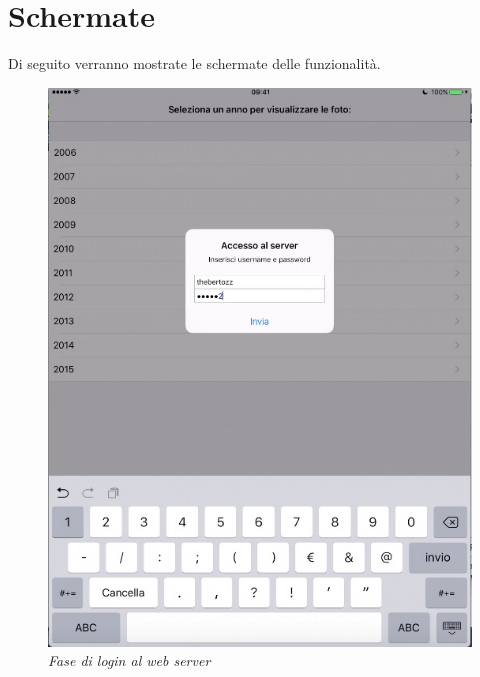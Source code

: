 \section{Schermate}
Di seguito verranno mostrate le schermate delle funzionalità.\\
\begin{figure}[H]
      \centering
      \includegraphics[scale=0.66]{immagini/app_login.jpg}
            \vspace{0.8cm}
            \caption{\textit{Fase di login al web server}}
\end{figure}
